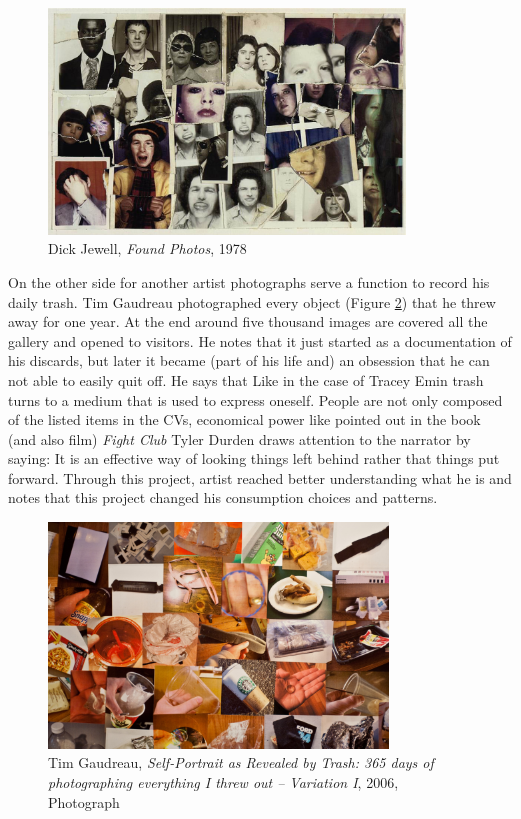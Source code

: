 \begin{figure}[h!]
  \centering
  \includegraphics[height=6cm]{graphics/DickJewell_FoundPhotos.jpg}
  \caption{Dick Jewell, \textit{Found Photos}, 1978}
  \label{fig:DickJewell_FoundPhotos}
\end{figure}

On the other side for another artist photographs serve a function to record his daily trash. Tim Gaudreau photographed every object (Figure \ref{fig:TimGaudreau_SelfPotraitRevealedByTrash}) that he threw away for one year. At the end around five thousand images are covered all the gallery and opened to visitors. He notes that it just started as a documentation of his discards, but later it became (part of his life and) an obsession that he can not able to easily quit off. He says that  Like in the case of Tracey Emin trash turns to a medium that is used to express oneself. People are not only composed of the listed items in the CVs, economical power like pointed out in the book (and also film) \textit{Fight Club} Tyler Durden draws attention to the narrator by saying:  It is an effective way of looking things left behind rather that things put forward. Through this project, artist reached better understanding what he is and notes that this project changed his consumption choices and patterns.

\begin{figure}[h!]
  \centering
  \includegraphics[height=6cm]{graphics/TimGaudreau_SelfPotraitRevealedByTrash.jpg}
  \caption{Tim Gaudreau, \textit{Self-Portrait as Revealed by Trash: 365 days of photographing everything I threw out – Variation I}, 2006, Photograph}
  \label{fig:TimGaudreau_SelfPotraitRevealedByTrash}
\end{figure}

